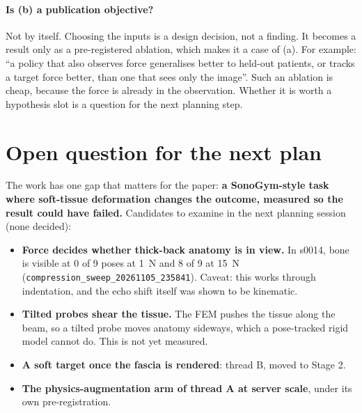 \documentclass[11pt,a4paper]{article}
\newcommand{\src}[1]{\texttt{\small #1}}
\begin{document}
\paragraph{Is (b) a publication objective?} Not by itself. Choosing the inputs is a design decision, not a finding.
It becomes a result only as a pre-registered ablation, which makes it a case of (a). For example: ``a policy that
also observes force generalises better to held-out patients, or tracks a target force better, than one that sees
only the image''. Such an ablation is cheap, because the force is already in the observation. Whether it is worth
a hypothesis slot is a question for the next planning step.

\section{Open question for the next plan}
The work has one gap that matters for the paper: \textbf{a SonoGym-style task where soft-tissue deformation changes
the outcome, measured so the result could have failed.} Candidates to examine in the next planning session (none
decided):
\begin{itemize}
  \item \textbf{Force decides whether thick-back anatomy is in view.} In s0014, bone is visible at 0 of 9 poses at
    1~N and 8 of 9 at 15~N (\src{compression\_sweep\_20261105\_235841}). Caveat: this works through indentation, and
    the echo shift itself was shown to be kinematic.
  \item \textbf{Tilted probes shear the tissue.} The FEM pushes the tissue along the beam, so a tilted probe moves
    anatomy sideways, which a pose-tracked rigid model cannot do. This is not yet measured.
  \item \textbf{A soft target once the fascia is rendered}: thread B, moved to Stage 2.
  \item \textbf{The physics-augmentation arm of thread A at server scale}, under its own pre-registration.
\end{itemize}

\appendix
\end{document}
